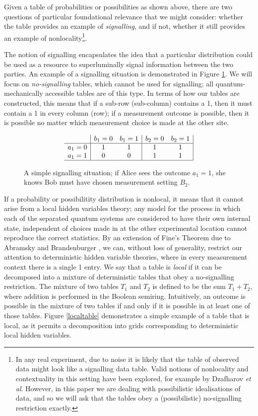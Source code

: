 \documentclass[reprint]{revtex4-1}
\theoremstyle{definition}
\begin{document}
Given a table of probabilities or possibilities as shown above, there are two questions of particular foundational relevance that we might consider: whether the table provides an example of \emph{signalling}, and if not, whether it still provides an example of nonlocality\footnote{In any real experiment, due to noise it is likely that the table of observed data might look like a signalling data table. Valid notions of nonlocality and contextuality in this setting have been explored, for example by Dzafharov \emph{et al}\cite{Dzha2016}. However, in this paper we are dealing with possibilistic idealisations of data, and so we will ask that the tables obey a (possibilistic) no-signalling restriction exactly.}. 

The notion of signalling encapsulates the idea that a particular distribution could be used as a resource to superluminally signal information between the two parties. An example of a signalling situation is demonstrated in Figure \ref{sig}. We will focus on \emph{no-signalling} tables, which cannot be used for signalling; all quantum-mechanically accessible tables are of this type. In terms of how our tables are constructed, this means that if a sub-row (sub-column) contains a 1, then it must contain a 1 in every column (row); if a measurement outcome is possible, then it is possible no matter which measurement choice is made at the other site.
\begin{figure}
\begin{equation*}
\begin{array}{c| c c | c c |}
&b_1=0&b_1=1&b_2=0&b_2=1\\ \hline
a_1=0&1 &1  &1 & 1\\
a_1=1&0&0 &1 &1\\ \hline
\end{array} 
\end{equation*}
\caption{A simple signalling situation; if Alice sees the outcome $a_1=1$, she knows Bob must have chosen measurement setting $B_2$.}
\label{sig}
\end{figure}

If a probability or possibilitity distribution is nonlocal, it means that it cannot arise from a local hidden variables theory; any model for the process in which each of the separated quantum systems are considered to have their own internal state, independent of choices made in at the other experimental location cannot reproduce the correct statistics. By an extension of Fine's Theorem due to Abramsky and Brandenburger \cite{Fine1982, Abra2011-b}, we can, without loss of generality, restrict our attention to deterministic hidden variable theories, where in every measurement context there is a single 1 entry. We say that a table is \emph{local} if it can be decomposed into a mixture of deterministic tables that obey a no-signalling restriction. The mixture of two tables $T_1$ and $T_2$ is defined to be the sum $T_1+T_2$, where addition is performed in the Boolean semiring. Intuitively, an outcome is possible in the mixture of two tables if and only if it is possible in at least one of those tables. Figure \ref{localtable} demonstrates a simple example of a table that is local, as it permits a decomposition into grids corresponding to deterministic local hidden variables.
\end{document}
